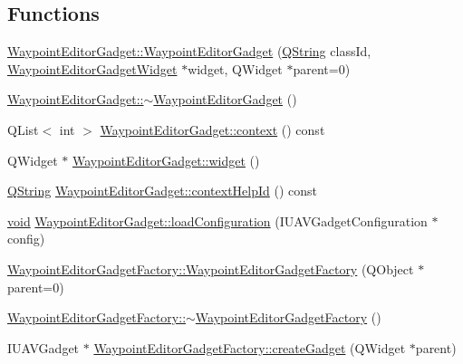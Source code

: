\subsection*{\-Functions}
\begin{DoxyCompactItemize}
\item 
\hyperlink{group___waypoint_editor_gadget_plugin_gafb34f259f81e6e7a200d84a3b955734f}{\-Waypoint\-Editor\-Gadget\-::\-Waypoint\-Editor\-Gadget} (\hyperlink{group___u_a_v_objects_plugin_gab9d252f49c333c94a72f97ce3105a32d}{\-Q\-String} class\-Id, \hyperlink{class_waypoint_editor_gadget_widget}{\-Waypoint\-Editor\-Gadget\-Widget} $\ast$widget, \-Q\-Widget $\ast$parent=0)
\item 
\hyperlink{group___waypoint_editor_gadget_plugin_ga3cdba64c9d39d71291529e2929a63552}{\-Waypoint\-Editor\-Gadget\-::$\sim$\-Waypoint\-Editor\-Gadget} ()
\item 
\-Q\-List$<$ int $>$ \hyperlink{group___waypoint_editor_gadget_plugin_ga90adc26647456b7dcb4bfc8fb0fb80d1}{\-Waypoint\-Editor\-Gadget\-::context} () const 
\item 
\-Q\-Widget $\ast$ \hyperlink{group___waypoint_editor_gadget_plugin_ga5c05d17087d355a8f6a0c428c89ccb09}{\-Waypoint\-Editor\-Gadget\-::widget} ()
\item 
\hyperlink{group___u_a_v_objects_plugin_gab9d252f49c333c94a72f97ce3105a32d}{\-Q\-String} \hyperlink{group___waypoint_editor_gadget_plugin_ga9aa5c62f07b81e2a3e782fe2581e7a9d}{\-Waypoint\-Editor\-Gadget\-::context\-Help\-Id} () const 
\item 
\hyperlink{group___u_a_v_objects_plugin_ga444cf2ff3f0ecbe028adce838d373f5c}{void} \hyperlink{group___waypoint_editor_gadget_plugin_ga14051e5dfbb5586837f5a4c092d4ef4c}{\-Waypoint\-Editor\-Gadget\-::load\-Configuration} (\-I\-U\-A\-V\-Gadget\-Configuration $\ast$config)
\item 
\hyperlink{group___waypoint_editor_gadget_plugin_ga270c7e089d8d3807f3f5039dd3191327}{\-Waypoint\-Editor\-Gadget\-Factory\-::\-Waypoint\-Editor\-Gadget\-Factory} (\-Q\-Object $\ast$parent=0)
\item 
\hyperlink{group___waypoint_editor_gadget_plugin_ga07a37c82dbc7c93b742ed17eac5b6ce4}{\-Waypoint\-Editor\-Gadget\-Factory\-::$\sim$\-Waypoint\-Editor\-Gadget\-Factory} ()
\item 
\-I\-U\-A\-V\-Gadget $\ast$ \hyperlink{group___waypoint_editor_gadget_plugin_ga542eee5447d62625cd21c9f57e20a8cb}{\-Waypoint\-Editor\-Gadget\-Factory\-::create\-Gadget} (\-Q\-Widget $\ast$parent)
\item 

\end{DoxyCompactItemize}

